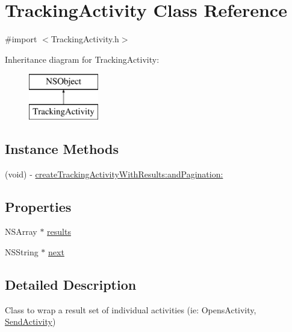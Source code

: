 \hypertarget{interface_tracking_activity}{\section{Tracking\-Activity Class Reference}
\label{interface_tracking_activity}
}


{\ttfamily \#import $<$Tracking\-Activity.\-h$>$}

Inheritance diagram for Tracking\-Activity\-:\begin{figure}[H]
\begin{center}
\leavevmode
\includegraphics[height=2.000000cm]{interface_tracking_activity}
\end{center}
\end{figure}
\subsection*{Instance Methods}
\begin{DoxyCompactItemize}
\item 
(void) -\/ \hyperlink{interface_tracking_activity_a5b6b4b305b96addf197d553c8e72d341}{create\-Tracking\-Activity\-With\-Results\-:and\-Pagination\-:}
\end{DoxyCompactItemize}
\subsection*{Properties}
\begin{DoxyCompactItemize}
\item 
N\-S\-Array $\ast$ \hyperlink{interface_tracking_activity_a6003c2eec97f88d0a029138a8045539f}{results}
\item 
N\-S\-String $\ast$ \hyperlink{interface_tracking_activity_a64cdd10b4b7470dd16c538a115540eaa}{next}
\end{DoxyCompactItemize}


\subsection{Detailed Description}
Class to wrap a result set of individual activities (ie\-: Opens\-Activity, \hyperlink{interface_send_activity}{Send\-Activity}) 

